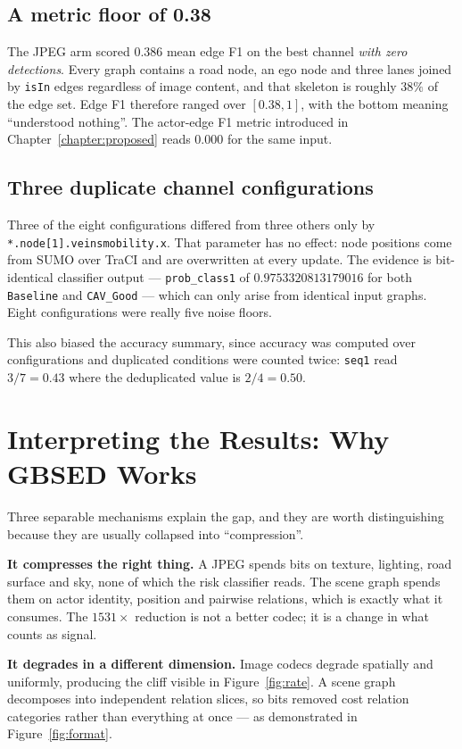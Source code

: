 \documentclass{iutbscthesis}
\begin{document}
\subsection{A metric floor of 0.38}

The JPEG arm scored $0.386$ mean edge F1 on the best channel \emph{with zero
detections}. Every graph contains a road node, an ego node and three lanes
joined by \texttt{isIn} edges regardless of image content, and that skeleton is
roughly $38\%$ of the edge set. Edge F1 therefore ranged over $[0.38, 1]$, with
the bottom meaning ``understood nothing''. The actor-edge F1 metric introduced
in Chapter~\ref{chapter:proposed} reads $0.000$ for the same input.

\subsection{Three duplicate channel configurations}

Three of the eight configurations differed from three others only by
\texttt{*.node[1].veinsmobility.x}. That parameter has no effect: node
positions come from SUMO over TraCI and are overwritten at every update. The
evidence is bit-identical classifier output --- \texttt{prob\_class1} of
$0.9753320813179016$ for both \texttt{Baseline} and \texttt{CAV\_Good} ---
which can only arise from identical input graphs. Eight configurations were
really five noise floors.

This also biased the accuracy summary, since accuracy was computed over
configurations and duplicated conditions were counted twice:
\texttt{seq1} read $3/7 = 0.43$ where the deduplicated value is $2/4 = 0.50$.

\section{Interpreting the Results: Why GBSED Works}

Three separable mechanisms explain the gap, and they are worth distinguishing
because they are usually collapsed into ``compression''.

\textbf{It compresses the right thing.} A JPEG spends bits on texture,
lighting, road surface and sky, none of which the risk classifier reads. The
scene graph spends them on actor identity, position and pairwise relations,
which is exactly what it consumes. The $1531\times$ reduction is not a better
codec; it is a change in what counts as signal.

\textbf{It degrades in a different dimension.} Image codecs degrade spatially
and uniformly, producing the cliff visible in Figure~\ref{fig:rate}. A scene
graph decomposes into independent relation slices, so bits removed cost
relation categories rather than everything at once --- as demonstrated in
Figure~\ref{fig:format}.
\end{document}
